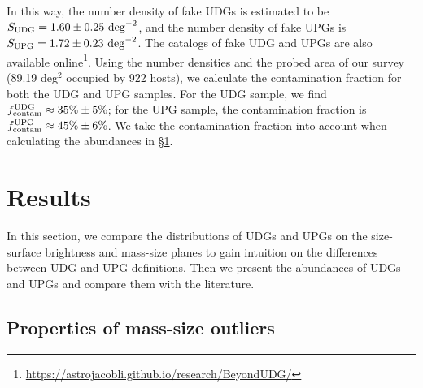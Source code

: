 \documentclass[twocolumn,astrosymb,twocolappendix,linenumbers]{aastex631}
\begin{document}
\begin{CJK*}{UTF8}{gbsn}
In this way, the number density of fake UDGs is estimated to be $S_{\rm UDG} = 1.60\pm0.25\ \mathrm{deg}^{-2}$, and the number density of fake UPGs is $S_{\rm UPG} = 1.72\pm0.23\ \mathrm{deg}^{-2}$. The catalogs of fake UDG and UPGs are also available online\footnote{\url{https://astrojacobli.github.io/research/BeyondUDG/}}. Using the number densities and the probed area of our survey (89.19 deg$^{2}$ occupied by 922 hosts), we calculate the contamination fraction for both the UDG and UPG samples. For the UDG sample, we find $f_{\rm contam}^{\rm UDG} \approx 35\%\pm5\%$; for the UPG sample, the contamination fraction is $f_{\rm contam}^{\rm UPG} \approx 45\%\pm6\%$. We take the contamination fraction into account when calculating the abundances in \S\ref{sec:results}.


\section{Results}\label{sec:results}
In this section, we compare the distributions of UDGs and UPGs on the size-surface brightness and mass-size planes to gain intuition on the differences between UDG and UPG definitions. Then we present the abundances of UDGs and UPGs and compare them with the literature. 

\subsection{Properties of mass-size outliers}\label{sec:mass-size}


\end{CJK*}
\end{document}
